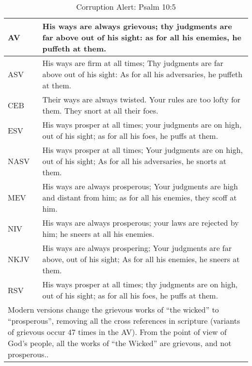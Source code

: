 
\begin{center}

\begin{table}[ht]
\centering
\begin{tabular}{|p{.5in}|p{3.5in}|}
    \hline

\textcolor[rgb]{0.00,0.00,1.00}{AV} & \textcolor[rgb]{0.00,0.00,1.00}{His ways are always grievous; thy judgments are far above out of his sight: as for all his enemies, he puffeth at them.} \\ \hline
%
ASV &  His ways are firm at all times; Thy judgments are far above out of his sight: As for all his adversaries, he puffeth at them. \\ \hline
%
CEB &  Their ways are always twisted.  Your rules are too lofty for them.   They snort at all their foes. \\ \hline
%
ESV & His ways prosper at all times;  your judgments are on high, out of his sight;   as for all his foes, he puffs at them. \\ \hline
%
NASV &  His ways prosper at all times; Your judgments are on high, out of his sight;  As for all his adversaries, he snorts at them.\\ \hline
%
MEV & His ways are always prosperous; Your judgments are high and distant from him;   as for all his enemies, they scoff at him. \\ \hline
%
NIV & His ways are always prosperous;   your laws are rejected by him;    he sneers at all his enemies. \\ \hline
%
NKJV &  His ways are always prospering; Your judgments are far above, out of his sight; As for all his enemies, he sneers at them.\\ \hline
%
RSV & His ways prosper at all times;   thy judgments are on high, out of his sight;  as for all his foes, he puffs at them.\\ \hline
 \hline

\multicolumn{2}{|p{4.3in}|}{{\textcolor{jungle}{Modern versions change the grievous works of ``the wicked'' to ``prosperous'', removing all the cross references in scripture (variants of grievous occur 47 times in the AV).  From the point of view of God's people, all the works of ``the Wicked'' are grievous, and not prosperous.\cite{Ruckman1992PsalmsV1}.}}} \\ \hline

\end{tabular}
\caption[Corruption Alert: Psalm 10:5]{Corruption Alert: Psalm 10:5} \label{table:Corruption Psalm 10:5}

\end{table}

\end{center}